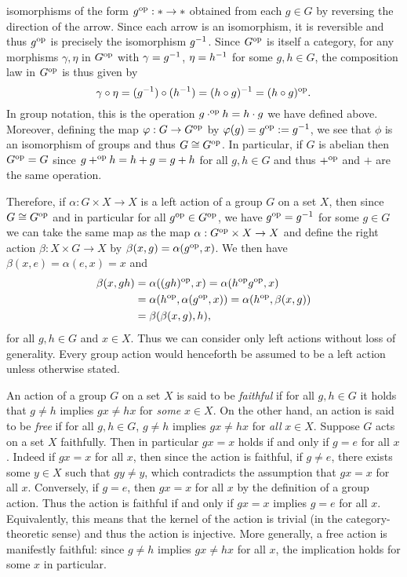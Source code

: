 \begin{example}
    isomorphisms of the form \(g^{\mathrm{op}}: * \to *\) obtained from each \(g \in G\)
    by reversing the direction of the arrow. Since each arrow is an isomorphism,
    it is reversible and thus \(g^{\mathrm{op}}\) is precisely the isomorphism \(g^{-1}\).
    Since \(G^{\mathrm{op}}\) is itself a category, for any morphisms \(\gamma, \eta\) in
    \(G^{\mathrm{op}}\) with \(\gamma = g^{-1}\), \(\eta = h^{-1}\) for some \(g, h \in G\),
    the composition law in \(G^{\mathrm{op}}\) is thus given by
    \[
        \gamma \circ \eta = (g^{-1}) \circ (h^{-1}) = (h \circ g)^{-1} = (h \circ g)^{\mathrm{op}}.
    \]
    In group notation, this is the operation \(g \cdot^{\mathrm{op}} h = h \cdot g\) we
    have defined above. Moreover, defining the map \(\varphi : G \to G^{\mathrm{op}}\) by
    \(\varphi(g) = g^{\mathrm{op}} := g^{-1}\), we see that \(\phi\) is an isomorphism of
    groups and thus \(G \cong G^{\mathrm{op}}\). In particular, if \(G\) is abelian then
    \(G^{\mathrm{op}} = G\) since \(g +^{\mathrm{op}} h = h + g = g + h\) for all \(g, h \in G\) and
    thus \(+^{\mathrm{op}}\) and \(+\) are the same operation.

    Therefore, if  \(\alpha : G \times X \to X\) is a left action of a group
    \(G\) on a set \(X\), then since \(G \cong G^{\mathrm{op}}\) and in particular for all
    \(g^{\mathrm{op}} \in G^{\mathrm{op}}\), we have \(g^{\mathrm{op}} = g^{-1}\) for some \(g \in G\) we can
    take the same map as the map \(\alpha : G^{\mathrm{op}} \times X \to X\) and define
    the right action \(\beta : X \times G \to X\) by \(\beta(x, g) =
    \alpha(g^{\mathrm{op}}, x)\). We then have \(\beta(x, e) = \alpha(e, x) = x\) and
    \begin{align*}
        \beta(x, gh) &= \alpha((gh)^{\mathrm{op}}, x) = \alpha(h^{\mathrm{op}} g^{\mathrm{op}}, x) \\
        &= \alpha(h^{\mathrm{op}}, \alpha(g^{\mathrm{op}}, x)) = \alpha(h^{\mathrm{op}}, \beta(x, g))\\
        &= \beta(\beta(x, g), h),
    \end{align*}
    for all \(g, h \in G\) and \(x \in X\). Thus we can consider only left
    actions without loss of generality. Every group action would henceforth be
    assumed to be a left action unless otherwise stated.
\end{example}

An action of a group \(G\) on a set \(X\) is said to be \emph{faithful} if for
all \(g, h \in G\) it holds that \(g \neq h\) implies \(gx \neq hx\) for
\emph{some} \(x \in X\). On the other hand, an action is said to be \emph{free}
if for all \(g, h \in G\), \(g \neq h\) implies \(gx \neq hx\) for \emph{all}
\(x \in X\). Suppose \(G\) acts on a set \(X\) faithfully. Then in particular
\(gx = x\) holds if and only if \(g = e\) for all \(x\). Indeed if \(gx = x\)
for all \(x\), then since the action is faithful, if \(g \neq e\), there exists
some \(y \in X\) such that \(gy \neq y\), which contradicts the assumption that
\(gx = x\) for all \(x\). Conversely, if \(g = e\), then \(gx = x\) for all
\(x\) by the definition of a group action. Thus the action is faithful if and
only if \(gx = x\) implies \(g = e\) for all \(x\). Equivalently, this means
that the kernel of the action is trivial (in the category-theoretic sense) and
thus the action is injective. More generally, a free action is manifestly
faithful: since \(g \neq h\) implies \(gx \neq hx\) for all \(x\), the
implication holds for some \(x\) in particular.

